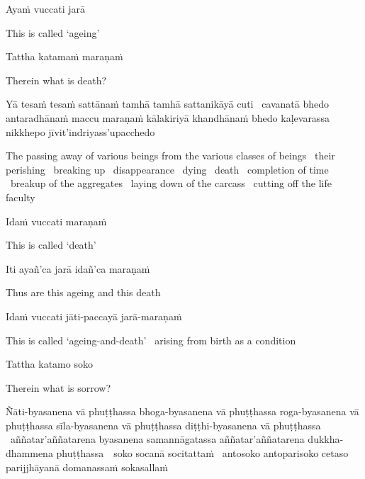 Ayaṁ vuccati jarā

\begin{english}
This is called `ageing'
\end{english}

Tattha katamaṁ maraṇaṁ

\begin{english}
Therein what is death?
\end{english}

\begin{pali-hang}
Yā tesaṁ tesaṁ sattānaṁ tamhā tamhā sattanikāyā cuti \breathmark\ cavanatā bhedo antaradhānaṁ maccu maraṇaṁ kālakiriyā khandhānaṁ bhedo kaḷevarassa nikkhepo jīvit'indriyass'upacchedo
\end{pali-hang}

\begin{english-hang-verses}
The passing away of various beings from the various classes of beings \breathmark\ their perishing \breathmark\ breaking up \breathmark\ disappearance \breathmark\ dying \breathmark\ death \breathmark\ completion of time \breathmark\ breakup of the aggregates \breathmark\ laying down of the carcass \breathmark\ cutting off the life faculty
\end{english-hang-verses}

Idaṁ vuccati maraṇaṁ

\begin{english}
This is called `death'
\end{english}

Iti ayañ'ca jarā idañ'ca maraṇaṁ

\begin{english}
Thus are this ageing and this death
\end{english}

Idaṁ vuccati jāti-paccayā jarā-maraṇaṁ

\begin{english}
  This is called `ageing-and-death' \breathmark\ arising from birth as a condition
\end{english}

Tattha katamo soko

\begin{english}
  Therein what is sorrow?
\end{english}

\begin{pali-hang}
  Ñāti-byasanena vā phuṭṭhassa bhoga-byasanena vā phuṭṭhassa roga-byasanena vā phuṭṭhassa sīla-byasanena vā phuṭṭhassa diṭṭhi-byasanena vā phuṭṭhassa \breathmark\ aññatar'aññatarena byasanena samannāgatassa aññatar'aññatarena dukkha-dhammena \mbox{phuṭṭhassa}~\breathmark\ soko socanā socitattaṁ \breathmark\ antosoko antoparisoko cetaso parijjhāyanā domanassaṁ sokasallaṁ
\end{pali-hang}

